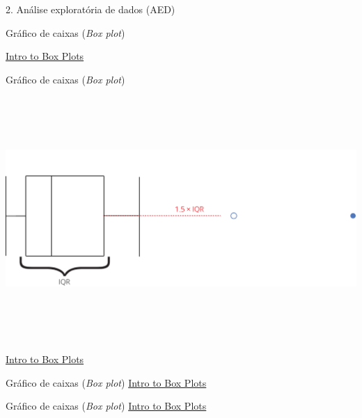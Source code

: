 \documentclass[
  ignorenonframetext,
]{beamer}
\begin{document}
\begin{frame}[fragile]{2. Análise exploratória de dados (AED)}
\begin{block}{Gráfico de caixas (\emph{Box plot})}
\protect\hypertarget{gruxe1fico-de-caixas-box-plot-3}{}
\pause

\href{https://plotly.com/chart-studio-help/what-is-a-box-plot/}{Intro to
Box Plots}
\end{block}

\begin{block}{Gráfico de caixas (\emph{Box plot})}
\protect\hypertarget{gruxe1fico-de-caixas-box-plot-4}{}
\pause

\includegraphics[width=10.41667in,height=3.64583in]{img/boxplotfig7.gif}

\href{https://plotly.com/chart-studio-help/what-is-a-box-plot/}{Intro to
Box Plots}
\end{block}

\begin{block}{Gráfico de caixas (\emph{Box plot})}
\protect\hypertarget{gruxe1fico-de-caixas-box-plot-5}{}
\href{https://plotly.com/chart-studio-help/what-is-a-box-plot/}{Intro to
Box Plots}
\end{block}

\begin{block}{Gráfico de caixas (\emph{Box plot})}
\protect\hypertarget{gruxe1fico-de-caixas-box-plot-6}{}
\href{https://plotly.com/chart-studio-help/what-is-a-box-plot/}{Intro to
Box Plots}
\end{block}
\end{frame}
\end{document}
